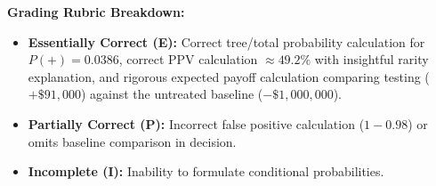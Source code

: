 \begin{frqrubricbox}
\textbf{Grading Rubric Breakdown:}\\
\begin{itemize}
  \item \textbf{Essentially Correct (E):} Correct tree/total probability calculation for $P(+) = 0.0386$, correct PPV calculation $\approx 49.2\%$ with insightful rarity explanation, and rigorous expected payoff calculation comparing testing ($+\$91,000$) against the untreated baseline ($-\$1,000,000$).
  \item \textbf{Partially Correct (P):} Incorrect false positive calculation ($1 - 0.98$) or omits baseline comparison in decision.
  \item \textbf{Incomplete (I):} Inability to formulate conditional probabilities.
\end{itemize}
\end{frqrubricbox}
